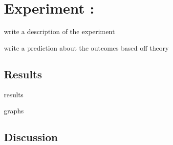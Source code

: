 \section{Experiment :}
write a description of the experiment

write a prediction about the outcomes based off theory

\subsection{Results}

results

graphs
\subsection{Discussion}
